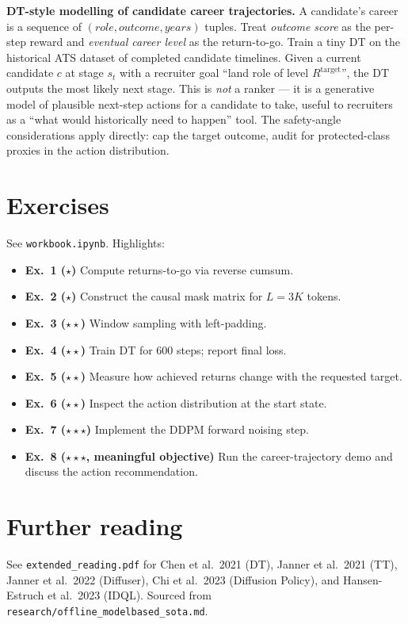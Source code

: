 \documentclass[11pt,oneside]{scrbook}
\begin{document}
\begin{matching}
\textbf{DT-style modelling of candidate career trajectories.} A candidate's career is a sequence of $(\textit{role}, \textit{outcome}, \textit{years})$ tuples. Treat \emph{outcome score} as the per-step reward and \emph{eventual career level} as the return-to-go. Train a tiny DT on the historical ATS dataset of completed candidate timelines. Given a current candidate $c$ at stage $s_t$ with a recruiter goal ``land role of level $R^{\mathrm{target}}$'', the DT outputs the most likely next stage. This is \emph{not} a ranker --- it is a generative model of plausible next-step actions for a candidate to take, useful to recruiters as a ``what would historically need to happen'' tool. The safety-angle considerations apply directly: cap the target outcome, audit for protected-class proxies in the action distribution.
\end{matching}

\chapter{Exercises}

See \texttt{workbook.ipynb}. Highlights:
\begin{itemize}
  \item \textbf{Ex.\ 1 ($\star$)} Compute returns-to-go via reverse cumsum.
  \item \textbf{Ex.\ 2 ($\star$)} Construct the causal mask matrix for $L = 3K$ tokens.
  \item \textbf{Ex.\ 3 ($\star\star$)} Window sampling with left-padding.
  \item \textbf{Ex.\ 4 ($\star\star$)} Train DT for 600 steps; report final loss.
  \item \textbf{Ex.\ 5 ($\star\star$)} Measure how achieved returns change with the requested target.
  \item \textbf{Ex.\ 6 ($\star\star$)} Inspect the action distribution at the start state.
  \item \textbf{Ex.\ 7 ($\star\star\star$)} Implement the DDPM forward noising step.
  \item \textbf{Ex.\ 8 ($\star\star\star$, meaningful objective)} Run the career-trajectory demo and discuss the action recommendation.
\end{itemize}

\chapter{Further reading}

See \texttt{extended\_reading.pdf} for Chen et al.\ 2021 (DT), Janner et al.\ 2021 (TT), Janner et al.\ 2022 (Diffuser), Chi et al.\ 2023 (Diffusion Policy), and Hansen-Estruch et al.\ 2023 (IDQL). Sourced from \texttt{research/offline\_modelbased\_sota.md}.
\end{document}
